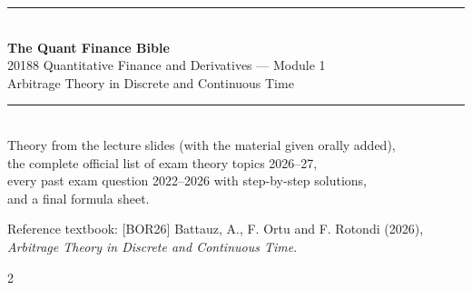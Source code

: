 \documentclass[11pt,a4paper,oneside]{book}
\begin{document}
\begin{titlepage}
\centering
\vspace*{3cm}
{\color{chapcol}\rule{\textwidth}{1.5pt}}\\[0.6cm]
{\Huge\bfseries\color{chapcol} The Quant Finance Bible\\[0.4cm]}
{\Large 20188 Quantitative Finance and Derivatives --- Module 1\\[0.2cm]
Arbitrage Theory in Discrete and Continuous Time}\\[0.4cm]
{\color{chapcol}\rule{\textwidth}{1.5pt}}\\[1.5cm]
{\large Theory from the lecture slides (with the material given orally added),\\
the complete official list of exam theory topics 2026--27,\\
every past exam question 2022--2026 with step-by-step solutions,\\
and a final formula sheet.}\\[2cm]
\vfill
{\small Reference textbook: [BOR26] Battauz, A., F. Ortu and F. Rotondi (2026), \emph{Arbitrage Theory in Discrete and Continuous Time}.}
\end{titlepage}
\begin{multicols}{2}
\tableofcontents
\end{multicols}
\clearpage
{}














\end{document}
